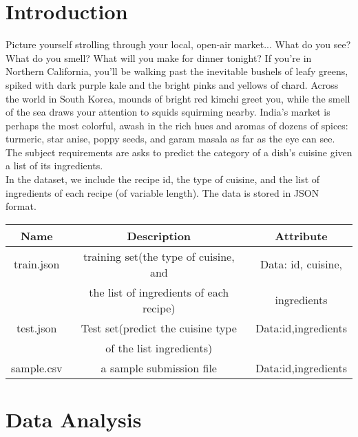 \section{Introduction}\label{sec-intro}

\text
    Picture yourself strolling through your local, open-air market... What do you see? What do you smell? What will you make for dinner tonight?
    If you're in Northern California, you'll be walking past the inevitable bushels of leafy greens, spiked with dark purple kale and the bright pinks and yellows of chard. Across the world in South Korea, mounds of bright red kimchi greet you, while the smell of the sea draws your attention to squids squirming nearby. 
    India’s market is perhaps the most colorful, awash in the rich hues and aromas of dozens of spices: turmeric, star anise, poppy seeds, and garam masala as far as the eye can see.
    The subject requirements are asks to predict the category of a dish's cuisine given a list of its ingredients.\\
    In the dataset, we include the recipe id, the type of cuisine, and the list of ingredients of each recipe (of variable length). The data is stored in JSON format. \\
    

    \vspace{.5cm}
  	\begin{tabular}{ c | c | c }
      \toprule
      Name & Description & Attribute      \\
      \midrule
      train.json & training set(the type of cuisine, and & Data: id, cuisine,\\     
                 & the list of ingredients of each recipe) & ingredients\\
     \midrule
       test.json & Test set(predict the cuisine type & Data:id,ingredients     \\
                 & of the list ingredients) &     \\
      \midrule
      sample.csv & a sample submission file & Data:id,ingredients     \\
       \bottomrule
  \end{tabular}


\section{Data Analysis} \label{sec-conclusions}

